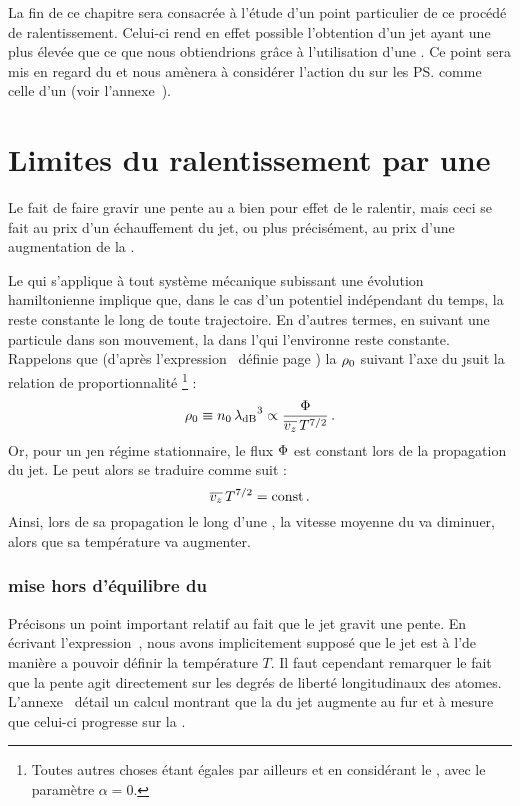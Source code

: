 La fin de ce chapitre sera consacrée à l'étude d'un point particulier de ce procédé de ralentissement. Celui-ci rend en effet possible l'obtention d'un jet ayant une \ddedp plus élevée que ce que nous obtiendrions grâce à l'utilisation d'une \secpent.
Ce point sera mis en regard du \thLi et nous amènera à considérer l'action du \mimo sur les \ps comme celle d'un  (voir l'annexe~).


\section{Limites du ralentissement par une \secpent}\label{sec:LimitePente}


Le fait de faire gravir une pente au \jat a bien pour effet de le ralentir, mais ceci se fait au prix d'un échauffement du jet, ou plus précisément, au prix d'une augmentation de la \dispvitlong. 

Le \thLi qui s'applique à tout système mécanique subissant une évolution hamiltonienne implique que, dans le cas d'un potentiel indépendant du temps, la \ddedp
reste constante le long de toute trajectoire. 
En d'autres termes, en suivant une particule dans son mouvement, la \fdd dans l'\edp qui l'environne reste constante. 
Rappelons que (d'après l'expression~ définie page \pageref{eq:rhojetaxe}) la \ddedp ${\rho_{0}}$ suivant l'axe du \j suit la relation de proportionnalité%
\footnote{Toutes autres choses étant égales par ailleurs et en considérant le \pptlin, \cad avec le paramètre $\alpha = 0$.} :
\[
	{\rho_{0}} \equiv {n_{0}} \, {\lambda_{\rm dB}}^3 
	\propto \frac{{\Phi}}{{\overline{v_z}}\,T^{{7} / {2}}} 
	\, .
\]
Or, pour un \j en régime stationnaire, le flux ${\Phi}$ est constant lors de la propagation du jet. Le \thLi peut alors se traduire comme suit%
:
\begin{equation}
	\vjet\,T^\ttfrac{7}{2} = \const 
	\pointformule
	\label{eq:VT72Cste}
\end{equation}	
Ainsi, lors de sa propagation le long d'une \secpent, la vitesse moyenne du \jat va diminuer, alors que sa température va augmenter. 

\casse

\subsubsection{mise hors d'équilibre du \jat}
{
Précisons un point important relatif au fait que le jet gravit une pente.
En écrivant l'expression~, nous avons implicitement supposé que le jet est à l'\eqthdy de manière a pouvoir définir la température $T$. Il faut cependant remarquer le fait que la pente agit directement sur les degrés de liberté longitudinaux des atomes. L'annexe~ détail un calcul \ud montrant que la \dispvitlong du jet augmente au fur et à mesure que celui-ci progresse sur la \secpent. 
}



